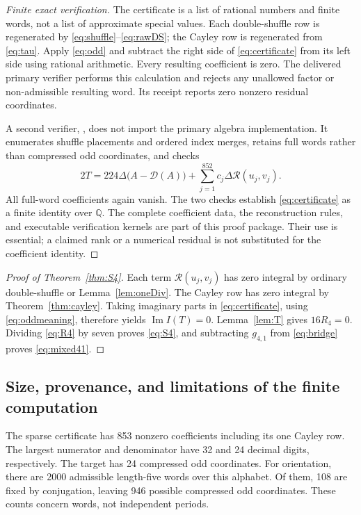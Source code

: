 \documentclass[11pt,letterpaper]{article}
\numberwithin{equation}{section}
\theoremstyle{definition}
\DeclareMathOperator{\Imag}{Im}
\newcommand{\Q}{\mathbb Q}
\newcommand{\cay}{\mathcal D}
\begin{document}
\begin{proof}[Finite exact verification]
The certificate is a list of rational numbers and finite words, not a
list of approximate special values. Each double-shuffle row is regenerated
by \eqref{eq:shuffle}--\eqref{eq:rawDS}; the Cayley row is regenerated
from \eqref{eq:tau}. Apply \eqref{eq:odd} and subtract the right side of
\eqref{eq:certificate} from its left side using rational arithmetic.
Every resulting coefficient is zero. The delivered primary verifier
 performs this calculation and rejects any
unallowed factor or non-admissible resulting word. Its receipt reports
zero nonzero residual coordinates.

A second verifier, , does not import
the primary algebra implementation. It enumerates shuffle placements
and ordered index merges, retains full words rather than compressed
odd coordinates, and checks
\begin{equation}
 2T=224\Delta\bigl(A-\cay(A)\bigr)
           +\sum_{j=1}^{852}c_j\Delta\mathcal R(u_j,v_j).
 \label{eq:fullcertificate}
\end{equation}
All full-word coefficients again vanish. The two checks establish
\eqref{eq:certificate} as a finite identity over $\Q$. The complete
coefficient data, the reconstruction rules, and executable verification
kernels are part of this proof package. Their use is essential; a claimed
rank or a numerical residual is not substituted for the coefficient
identity.
\end{proof}

\begin{proof}[Proof of Theorem~\ref{thm:S4}]
Each term $\mathcal R(u_j,v_j)$ has zero integral by ordinary
double-shuffle or Lemma~\ref{lem:oneDiv}. The Cayley row has zero integral
by Theorem~\ref{thm:cayley}. Taking imaginary parts in
\eqref{eq:certificate}, using \eqref{eq:oddmeaning}, therefore yields
$\Imag I(T)=0$. Lemma~\ref{lem:T} gives $16R_4=0$. Dividing
\eqref{eq:R4} by seven proves \eqref{eq:S4}, and subtracting $g_{4,1}$
from \eqref{eq:bridge} proves \eqref{eq:mixed41}.
\end{proof}

\subsection{Size, provenance, and limitations of the finite computation}
The sparse certificate has 853 nonzero coefficients including its one
Cayley row. The largest numerator and denominator have 32 and 24 decimal
digits, respectively. The target has 24 compressed odd coordinates.
For orientation, there are 2000 admissible length-five words over this
alphabet. Of them, 108 are fixed by conjugation, leaving 946 possible
compressed odd coordinates. These counts concern words, not independent
periods.
\end{document}
